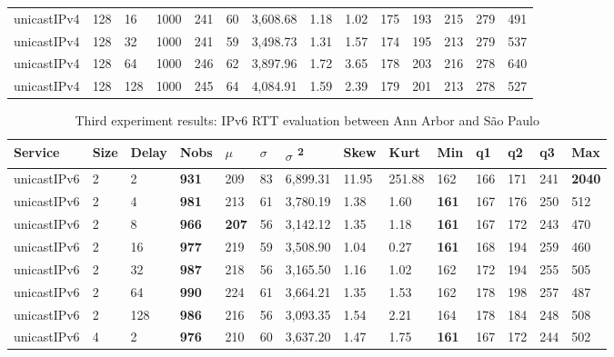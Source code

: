 \begin{table}[!htb]
\begin{tabular}{@{}llllllllllllll@{}}
		unicastIPv4 & 128          & 16    & 1000 & 241  & 60  & 3,608.68 & 1.18     & 1.02     & 175 & 193 & 215 & 279 & 491  \\
		unicastIPv4 & 128          & 32    & 1000 & 241  & 59  & 3,498.73 & 1.31     & 1.57     & 174 & 195 & 213 & 279 & 537  \\
		unicastIPv4 & 128          & 64    & 1000 & 246  & 62  & 3,897.96 & 1.72     & 3.65     & 178 & 203 & 216 & 278 & 640  \\
		unicastIPv4 & 128          & 128   & 1000 & 245  & 64  & 4,084.91 & 1.59     & 2.39     & 179 & 201 & 213 & 278 & 527  \\ \bottomrule
	\end{tabular}
\end{table}

\begin{table}[!htb]
	\centering
	\caption{Third experiment results: IPv6 RTT evaluation between Ann Arbor and São Paulo}
	\label{tab:thirdtrialarbsaoipv6}
	\begin{tabular}{@{}llllllllllllll@{}}
		\toprule
		Service    & Size & Delay & Nobs & $\mu$ & $\sigma$  & $\sigma$ \textsuperscript{2} & Skew & Kurt & Min & q1   & q2   & q3   & Max   \\ \midrule
		unicastIPv6 & 2            & 2     & \textbf{931}  & 209  & 83  & 6,899.31 & 11.95    & 251.88   & 162 & 166 & 171 & 241 & \textbf{2040} \\
		unicastIPv6 & 2            & 4     & \textbf{981}  & 213  & 61  & 3,780.19 & 1.38     & 1.60     & \textbf{161} & 167 & 176 & 250 & 512  \\
		unicastIPv6 & 2            & 8     & \textbf{966}  & \textbf{207}  & 56  & 3,142.12 & 1.35     & 1.18     & \textbf{161} & 167 & 172 & 243 & 470  \\
		unicastIPv6 & 2            & 16    & \textbf{977}  & 219  & 59  & 3,508.90 & 1.04     & 0.27     & \textbf{161} & 168 & 194 & 259 & 460  \\
		unicastIPv6 & 2            & 32    & \textbf{987}  & 218  & 56  & 3,165.50 & 1.16     & 1.02     & 162 & 172 & 194 & 255 & 505  \\
		unicastIPv6 & 2            & 64    & \textbf{990}  & 224  & 61  & 3,664.21 & 1.35     & 1.53     & 162 & 178 & 198 & 257 & 487  \\
		unicastIPv6 & 2            & 128   & \textbf{986}  & 216  & 56  & 3,093.35 & 1.54     & 2.21     & 164 & 178 & 184 & 248 & 508  \\ \hline
		unicastIPv6 & 4            & 2     & \textbf{976}  & 210  & 60  & 3,637.20 & 1.47     & 1.75     & \textbf{161} & 167 & 172 & 244 & 502  \\

\end{tabular}
\end{table}

